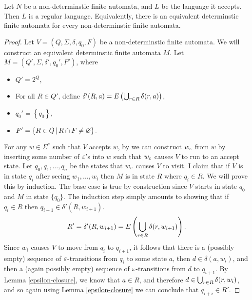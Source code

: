\begin{thm}\label{dfa-nfa-equivalence}
    Let $N$ be a non-determinstic finite automata, and $L$ be the language it accepts. Then $L$ is a regular language. Equivalently, there is an equivalent determinstic finite automata for every non-determinstic finite automata.
\end{thm}

\begin{proof}
    Let $V = \left(Q, \Sigma, \delta, q_0, F\right)$ be a non-determinstic finite automata. We will construct an equivalent determinstic finite automata $M$. Let $M = \left(Q', \Sigma, \delta', q_0', F'\right)$, where
    \begin{itemize}
        \item $Q' = 2^Q$,
        \item For all $R \in Q'$, define $\delta'(R, a) = E\left(\bigcup_{r \in R}\delta(r, a)\right)$,
        \item $q_0' = \left\{q_0\right\}$,
        \item $F' = \left\{R \in Q \,\middle|\, R \cap F \neq \varnothing\right\}$.
    \end{itemize}

    For any $w \in \Sigma^*$ such that $V$ accepts $w$, by we can construct $w_{\varepsilon}$ from $w$ by inserting some number of $\varepsilon$'s into $w$ such that $w_{\varepsilon}$ causes $V$ to run to an accept state. Let $q_0, q_1, \ldots, q_n$ be the states that $w_{\varepsilon}$ causes $V$ to visit. I claim that if $V$ is in state $q_i$ after seeing $w_1, \ldots, w_i$ then $M$ is in state $R$ where $q_i \in R$. We will prove this by induction. The base case is true by construction since $V$ starts in state $q_0$ and $M$ in state $\{q_0\}$. The induction step simply amounts to showing that if $q_i \in R$ then $q_{i+1} \in \delta'(R, w_{i+1})$.
    \begin{align*}
        R' = \delta'(R, w_{i+1}) = E\left(\bigcup_{r\in R}\delta(r, w_{i+1})\right).
    \end{align*}
    Since $w_i$ causes $V$ to move from $q_i$ to $q_{i+1}$, it follows that there is a (possibly empty) sequence of $\varepsilon$-transitions from $q_i$ to some state $a$, then $d \in \delta(a, w_i)$, and then a (again possibly empty) sequence of $\varepsilon$-transitions from $d$ to $q_{i+1}$. By Lemma \ref{epsilon-closure}, we know that $a \in R$, and therefore $d \in \bigcup_{r \in R}\delta(r, w_i)$, and so again using Lemma \ref{epsilon-closure} we can conclude that $q_{i+i} \in R'$.


\end{proof}
